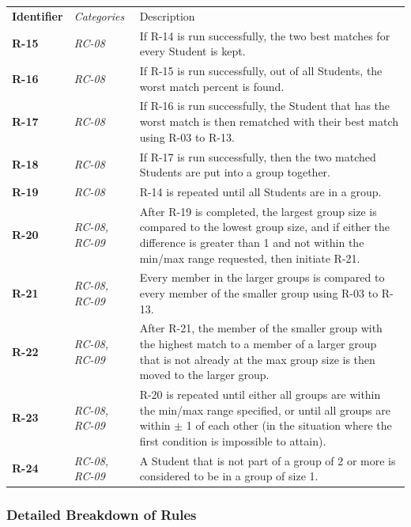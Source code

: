 \documentclass[12pt,letterpaper]{article}
\begin{document}
\begin{tabu} to 
	    \tableheader{}Identifier & Categories & Description\\
		R-15 & RC-08 & If R-14 is run successfully, the two best matches for every Student is kept.\\
		R-16 & RC-08 & If R-15 is run successfully, out of all Students, the worst match percent is found.\\
		R-17 & RC-08 & If R-16 is run successfully, the Student that has the worst match is then rematched with their best match using R-03 to R-13.\\
		R-18 & RC-08 & If R-17 is run successfully, then the two matched Students are put into a group together.\\
		R-19 & RC-08 & R-14 is repeated until all Students are in a group.\\
		R-20 & RC-08, RC-09 & After R-19 is completed, the largest group size is compared to the lowest group size, and if either the difference is greater than 1 and not within the min/max range requested, then initiate R-21.\\
		R-21 & RC-08, RC-09 & Every member in the larger groups is compared to every member of the smaller group using R-03 to R-13. \\
		R-22 & RC-08, RC-09 & After R-21, the member of the smaller group with the highest match to a member of a larger group that is not already at the max group size is then moved to the larger group.\\
		R-23 & RC-08, RC-09 & R-20 is repeated until either all groups are within the min/max range specified, or until all groups are within $\pm$ 1 of each other (in the situation where the first condition is impossible to attain).\\
		R-24 & RC-08, RC-09 & A Student that is not part of a group of 2 or more is considered to be in a group of size 1.
\end{tabu}

\newpage{}

\subsubsection{Detailed Breakdown of Rules}
\end{document}
